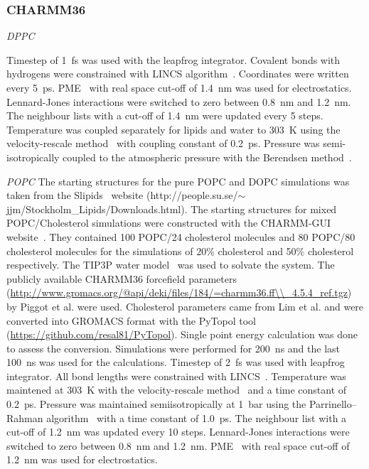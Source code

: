 \documentclass[pre,aps,floatfix,authordate1-4,twocolumn]{revtex4-1}
\begin{document}

\subsubsection{CHARMM36}

{\it DPPC}

Timestep of 1~fs was used with the leapfrog integrator. Covalent bonds with hydrogens were constrained with LINCS algorithm~\cite{hess97,hess07}. 
Coordinates were written every 5~ps. PME~\cite{darden93,essman95} with real space cut-off of 1.4~nm was used 
for electrostatics. Lennard-Jones interactions were switched to zero between 0.8~nm and 1.2~nm.
The neighbour lists with a cut-off of 1.4~nm were updated every 5 steps. Temperature was coupled separately
for lipids and water to 303~K using the velocity-rescale method~\cite{bussi07} with coupling constant of 0.2~ps.
Pressure was semi-isotropically coupled to the atmospheric pressure with the Berendsen method~\cite{berendsen84}.

{\it POPC}
The starting structures for the pure POPC and DOPC simulations was taken from the Slipids~\cite{jambeck12b} website (http://people.su.se/$\sim$jjm/Stockholm\_Lipids/Downloads.html).
The starting structures for mixed POPC/Cholesterol simulations were constructed with the CHARMM-GUI website~\cite{jo08}. 
They contained 100 POPC/24 cholesterol molecules and 80 POPC/80 cholesterol molecules for
the simulations of 20\% cholesterol and 50\% cholesterol respectively. The TIP3P water model~\cite{jorgensen83} was used to
solvate the system.
The publicly available CHARMM36 forcefield parameters (\url{http://www.gromacs.org/@api/deki/files/184/=charmm36.ff\\\_4.5.4\_ref.tgz}) 
by Piggot et al. \cite{piggot12} were used. Cholesterol parameters came
from Lim et al. \cite{lim12} and were converted into GROMACS format with the PyTopol tool (\url{https://github.com/resal81/PyTopol}).  
Single point energy calculation was done to assess the conversion. 
Simulations were performed for 200~ns and the last 100~ns was used for the calculations. Timestep of 2~fs was
used with leapfrog integrator. All bond lengths were constrained with LINCS~\cite{hess97,hess07}. Temperature was maintened at
303~K with the velocity-rescale method~\cite{bussi07} and a time constant of 0.2~ps. Pressure was maintained semiisotropically
at 1~bar using the Parrinello--Rahman algorithm~\cite{parrinello81} with a time constant of 1.0~ps. The neighbour list with a cut-off of 1.2~nm
was updated every 10 steps. Lennard-Jones interactions were switched to zero
between 0.8~nm and 1.2~nm. PME~\cite{darden93,essman95} with real space cut-off of 1.2~nm was used for electrostatics.
\end{document}

